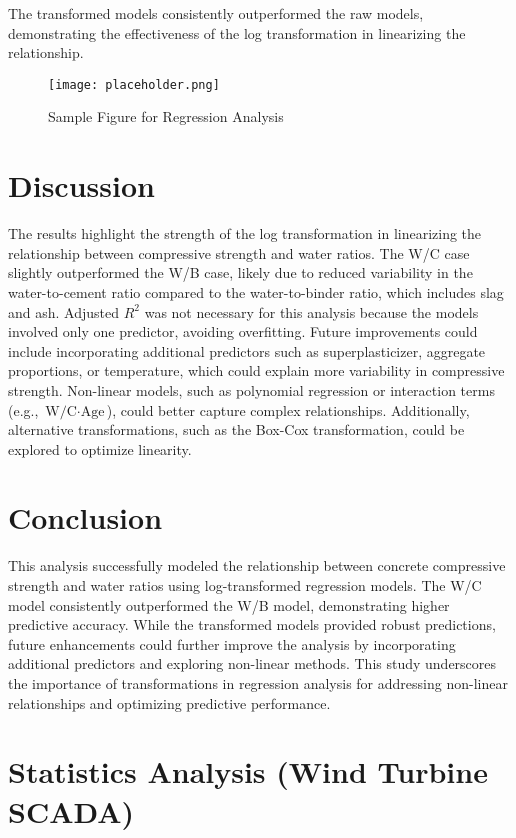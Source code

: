 \documentclass[a4paper,11pt]{article}
\begin{document}
The transformed models consistently outperformed the raw models, demonstrating the effectiveness of the log transformation in linearizing the relationship.

\begin{figure}[H]
    \centering
    \texttt{[image: placeholder.png]}
    \caption{Sample Figure for Regression Analysis}
\end{figure}


\section*{Discussion}
The results highlight the strength of the log transformation in linearizing the relationship between compressive strength and water ratios. The W/C case slightly outperformed the W/B case, likely due to reduced variability in the water-to-cement ratio compared to the water-to-binder ratio, which includes slag and ash. Adjusted \( R^2 \) was not necessary for this analysis because the models involved only one predictor, avoiding overfitting. Future improvements could include incorporating additional predictors such as superplasticizer, aggregate proportions, or temperature, which could explain more variability in compressive strength. Non-linear models, such as polynomial regression or interaction terms (e.g., \( \text{W/C} \cdot \text{Age} \)), could better capture complex relationships. Additionally, alternative transformations, such as the Box-Cox transformation, could be explored to optimize linearity.

\section*{Conclusion}
This analysis successfully modeled the relationship between concrete compressive strength and water ratios using log-transformed regression models. The W/C model consistently outperformed the W/B model, demonstrating higher predictive accuracy. While the transformed models provided robust predictions, future enhancements could further improve the analysis by incorporating additional predictors and exploring non-linear methods. This study underscores the importance of transformations in regression analysis for addressing non-linear relationships and optimizing predictive performance.

 


\newpage

\section{Statistics Analysis (Wind Turbine SCADA)}
\end{document}
